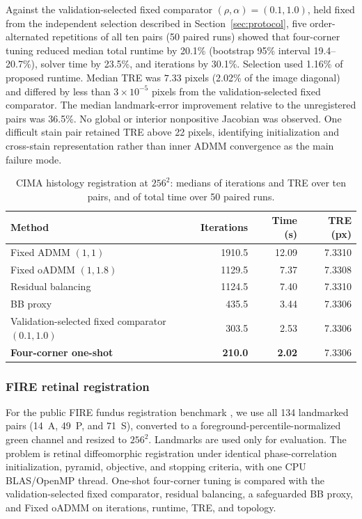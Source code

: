 \documentclass[11pt]{article}
\theoremstyle{definition}
\begin{document}
Against the validation-selected fixed comparator $(\rho,\alpha)=(0.1,1.0)$,
held fixed from the independent selection described in
Section~\ref{sec:protocol}, five order-alternated repetitions of all ten pairs
(50 paired runs) showed that four-corner tuning reduced
median total runtime by 20.1\% (bootstrap 95\% interval 19.4--20.7\%), solver
time by 23.5\%, and iterations by 30.1\%. Selection used 1.16\% of proposed
runtime. Median TRE was $7.33$ pixels (2.02\% of the image diagonal) and
differed by less than $3\times10^{-5}$ pixels from the validation-selected
fixed comparator. The
median landmark-error improvement relative to the unregistered pairs was
36.5\%. No global or interior nonpositive Jacobian was observed. One difficult
stain pair retained TRE above 22 pixels, identifying initialization and
cross-stain representation rather than inner ADMM convergence as the main
failure mode.

\begin{table}[H]
\centering
\caption{CIMA histology registration at $256^2$: medians of iterations and TRE
over ten pairs, and of total time over 50 paired runs.}
\label{tab:cima}
\begin{tabular}{lrrr}
\toprule
Method & Iterations & Time (s) & TRE (px)\\
\midrule
Fixed ADMM $(1, 1)$ & 1910.5 & 12.09 & 7.3310\\
Fixed oADMM $(1, 1.8)$ & 1129.5 & 7.37 & 7.3308\\
Residual balancing & 1124.5 & 7.40 & 7.3310\\
BB proxy & 435.5 & 3.44 & 7.3306\\
Validation-selected fixed comparator $(0.1, 1.0)$ & 303.5 & 2.53 & 7.3306\\
\textbf{Four-corner one-shot} & \textbf{210.0} & \textbf{2.02} & 7.3306\\
\bottomrule
\end{tabular}
\end{table}

\subsubsection{FIRE retinal registration}
For the public FIRE fundus registration benchmark
\cite{HernandezMatas2017}, we use all 134 landmarked pairs (14~A, 49~P, and
71~S), converted to a foreground-percentile-normalized green channel and
resized to $256^2$. Landmarks are used only for evaluation. The problem is
retinal diffeomorphic registration under identical phase-correlation
initialization, pyramid, objective, and stopping criteria, with one CPU
BLAS/OpenMP thread.
One-shot four-corner tuning is compared with the validation-selected fixed
comparator, residual balancing, a safeguarded BB proxy, and Fixed oADMM on
iterations, runtime, TRE, and topology.
\end{document}
